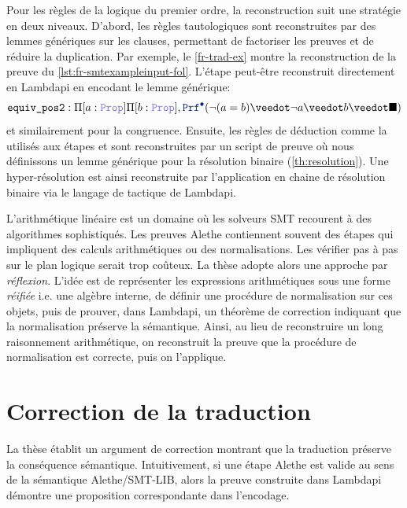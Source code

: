 Pour les règles de la logique du premier ordre, la reconstruction suit une stratégie en deux niveaux.
D'abord, les règles tautologiques sont reconstruites par des lemmes génériques sur les clauses, permettant de factoriser les preuves et de réduire la duplication.
Par exemple, le \cref{fr-trad-ex} montre la reconstruction de la preuve du \cref{lst:fr-smtexampleinput-fol}.
L'étape  peut-être reconstruit directement en Lambdapi en encodant le lemme générique:
\[
\kw{equiv\_pos2}: \Pi [a: \prop] \Pi [b: \prop], \pid (\neg (a = b) \veedot \neg a \veedot b \veedot \nil)
\]
et similairement pour la congruence. Ensuite, les règles de déduction comme la  utilisés aux étapes  et  sont reconstruites par un script de preuve où nous définissons un lemme générique pour la résolution binaire (\cref{th:resolution}).
Une hyper-résolution est ainsi reconstruite par l'application en chaine de résolution binaire via le langage de tactique de Lambdapi. 



L'arithmétique linéaire est un domaine où les solveurs SMT recourent à des algorithmes sophistiqués.
Les preuves Alethe contiennent souvent des étapes qui impliquent des calculs arithmétiques ou des normalisations.
Les vérifier pas à pas sur le plan logique serait trop coûteux. La thèse adopte alors une approche par \emph{réflexion}.
L'idée est de représenter les expressions arithmétiques sous une forme \emph{réifiée} i.e. une algèbre interne,
de définir une procédure de normalisation sur ces objets, puis de prouver, dans Lambdapi, un théorème de correction indiquant que la normalisation préserve la sémantique.
Ainsi, au lieu de reconstruire un long raisonnement arithmétique, on reconstruit la preuve que la procédure de normalisation est correcte, puis on l'applique.


\section*{Correction de la traduction}

La thèse établit un argument de correction montrant que la traduction préserve la conséquence sémantique.
Intuitivement, si une étape Alethe est valide au sens de la sémantique Alethe/SMT-LIB, alors la preuve construite dans Lambdapi démontre une proposition correspondante dans l'encodage.

